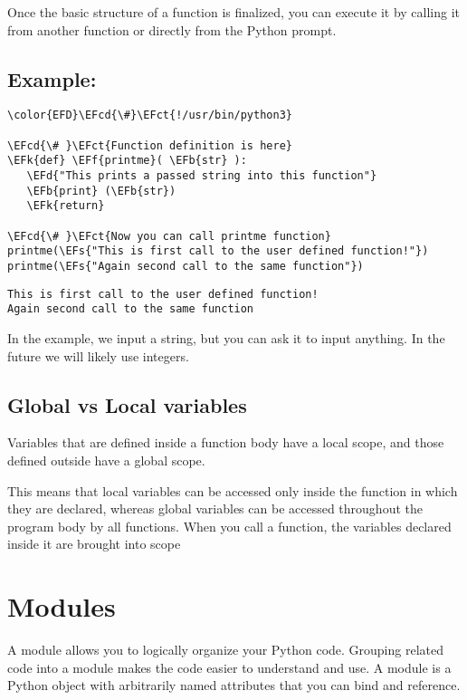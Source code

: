 \documentclass{scrartcl}
\newcommand{\EFk}[1]{\textcolor{EFk}{#1}} %
\newcommand{\EFd}[1]{\textcolor{EFd}{\textit{#1}}} %
\newcommand{\EFs}[1]{\textcolor{EFs}{#1}} %
\newcommand{\EFb}[1]{\textcolor{EFb}{#1}} %
\newcommand{\EFct}[1]{\textcolor{EFct}{#1}} %
\newcommand{\EFf}[1]{\textcolor{EFf}{#1}} %
\newcommand{\EFcd}[1]{\textcolor{EFcd}{#1}} %
\begin{document}
Once the basic structure of a function is finalized, you can execute it by
calling it from another function or directly from the Python prompt.

\subsection{Example:}
\label{sec:org09ed609}
\begin{Code}
\begin{Verbatim}[]
\color{EFD}\EFcd{\#}\EFct{!/usr/bin/python3}

\EFcd{\# }\EFct{Function definition is here}
\EFk{def} \EFf{printme}( \EFb{str} ):
   \EFd{"This prints a passed string into this function"}
   \EFb{print} (\EFb{str})
   \EFk{return}

\EFcd{\# }\EFct{Now you can call printme function}
printme(\EFs{"This is first call to the user defined function!"})
printme(\EFs{"Again second call to the same function"})
\end{Verbatim}
\end{Code}

\begin{verbatim}
This is first call to the user defined function!
Again second call to the same function
\end{verbatim}


In the example, we input a string, but you can ask it to input anything. In the
future we will likely use integers.

\subsection{Global vs Local variables}
\label{sec:org34117e6}
Variables that are defined inside a function body have a local scope, and those defined outside have a global scope.

This means that local variables can be accessed only inside the function in
which they are declared, whereas global variables can be accessed throughout the
program body by all functions. When you call a function, the variables declared
inside it are brought into scope

\section{Modules}
\label{sec:orgb4a2ddb}
A module allows you to logically organize your Python code. Grouping related code into a module makes the code easier to understand and use. A module is a Python object with arbitrarily named attributes that you can bind and reference.
\end{document}
